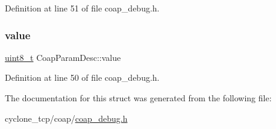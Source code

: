Definition at line 51 of file coap\+\_\+debug.\+h.

\mbox{\label{structCoapParamDesc_a96f06c3730fe07d3933b52e47712d2ed}} 
\subsubsection{\texorpdfstring{value}{value}}
{\footnotesize\ttfamily \hyperlink{stdint_8h_aba7bc1797add20fe3efdf37ced1182c5}{uint8\+\_\+t} Coap\+Param\+Desc\+::value}



Definition at line 50 of file coap\+\_\+debug.\+h.



The documentation for this struct was generated from the following file\+:\begin{DoxyCompactItemize}
\item 
cyclone\+\_\+tcp/coap/\hyperlink{coap__debug_8h}{coap\+\_\+debug.\+h}\end{DoxyCompactItemize}
